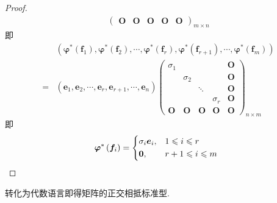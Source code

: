 {\begin{proof}
\begin{align*}
\begin{pmatrix}
                       \bm{O}   & \bm{O}   & \bm{O} & \bm{O}   & \bm{O}
                   \end{pmatrix}_{m\times n}
        \end{align*}即\begin{align*}
              & \left(
            \bm{\varphi}^*\left(
                \bm{f}_1
                \right),\bm{\varphi}^*\left(
                \bm{f}_2
                \right)
            ,\cdots,\bm{\varphi}^*\left(
                \bm{f}_r
                \right),\bm{\varphi}^*\left(
                \bm{f}_{r+1}
                \right),\cdots,\bm{\varphi}^*\left(
                \bm{f}_m
                \right)
            \right)    \\
            = & \left(
            \bm{e}_1,\bm{e}_2,\cdots,\bm{e}_r,\bm{e}_{r+1},\cdots,\bm{e}_n
            \right)\begin{pmatrix}
                       \sigma_1 &          &        &          & \bm{O} \\
                                & \sigma_2 &        &          & \bm{O} \\
                                &          & \ddots &          & \bm{O} \\
                                &          &        & \sigma_r & \bm{O} \\
                       \bm{O}   & \bm{O}   & \bm{O} & \bm{O}   & \bm{O}
                   \end{pmatrix}_{n\times m}
        \end{align*}即\[
            \bm{\varphi}^*\left(
            \bm{f}_i
            \right)=
            \begin{cases*}
                \sigma_i\bm{e}_i, & $1\leqslant i\leqslant r$   \\
                \bm{0},           & $r+1\leqslant i\leqslant m$
            \end{cases*}\qedhere
        \]
    \end{proof}
    转化为代数语言即得矩阵的正交相抵标准型.
}
